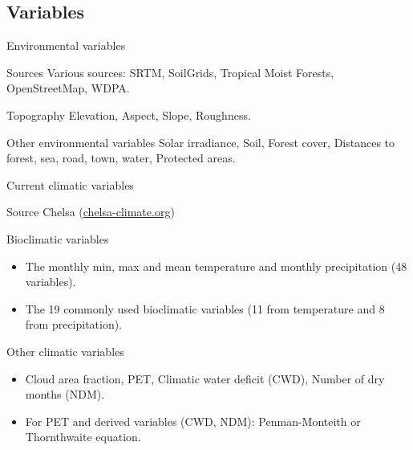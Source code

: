 \documentclass[10pt,table,dvipsnames,compress]{beamer}
\begin{document}
\subsection{Variables}
\label{sec:orgda41b98}

\begin{frame}[label={sec:org978a89b}]{Environmental variables}
\begin{block}{Sources}
Various sources: SRTM, SoilGrids, Tropical Moist Forests, OpenStreetMap, WDPA. 
\end{block}

\begin{block}{Topography}
Elevation, Aspect, Slope, Roughness.
\end{block}

\begin{block}{Other environmental variables}
Solar irradiance, Soil, Forest cover, Distances to forest, sea, road, town, water, Protected areas.
\end{block}
\end{frame}

\begin{frame}[label={sec:orgcb82468}]{Current climatic variables}
\begin{block}{Source}
Chelsa (\href{https://chelsa-climate.org)}{chelsa-climate.org})
\end{block}

\begin{block}{Bioclimatic variables}
\begin{itemize}
\item The monthly min, max and mean temperature and monthly precipitation (48 variables).
\item The 19 commonly used bioclimatic variables (11 from temperature and 8 from precipitation).
\end{itemize}
\end{block}

\begin{block}{Other climatic variables}
\begin{itemize}
\item Cloud area fraction, PET, Climatic water deficit (CWD), Number of dry months (NDM).
\item For PET and derived variables (CWD, NDM): Penman-Monteith or Thornthwaite equation.
\end{itemize}
\end{block}
\end{frame}
\end{document}
